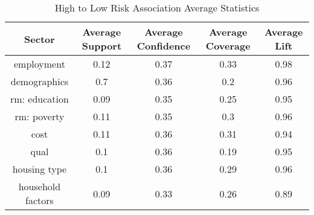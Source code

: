 \begin{table}[h]
    \centering
    \caption{High to Low Risk Association Average Statistics}
    \label{tab:high_low_risk}
    \begin{tabular}{|c|c|c|c|c|}
    \hline
    Sector & Average Support & Average Confidence & Average Coverage & Average Lift \\
    \hline
    employment & 0.12 & 0.37 & 0.33 & 0.98 \\
    \hline
    demographics & 0.7 & 0.36 & 0.2 & 0.96 \\
    \hline
    rm: education & 0.09 & 0.35 & 0.25 & 0.95 \\
    \hline
    rm: poverty & 0.11 & 0.35 & 0.3 & 0.96 \\
    \hline
    cost & 0.11 & 0.36 & 0.31 & 0.94 \\
    \hline
    qual & 0.1 & 0.36 & 0.19 & 0.95 \\
    \hline
    housing type & 0.1 & 0.36 & 0.29 & 0.96 \\
    \hline
    household factors & 0.09 & 0.33 & 0.26 & 0.89 \\
    \hline
    \end{tabular}
    \end{table}
      